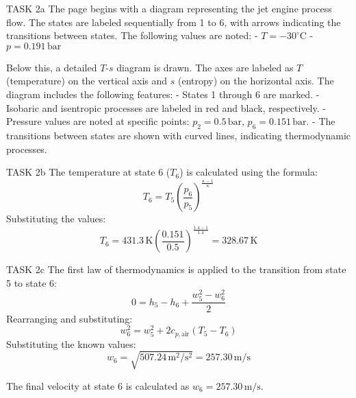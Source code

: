 TASK 2a  
The page begins with a diagram representing the jet engine process flow. The states are labeled sequentially from 1 to 6, with arrows indicating the transitions between states. The following values are noted:  
- \( T = -30^\circ\text{C} \)  
- \( p = 0.191 \, \text{bar} \)  

Below this, a detailed \( T \)-\( s \) diagram is drawn. The axes are labeled as \( T \) (temperature) on the vertical axis and \( s \) (entropy) on the horizontal axis. The diagram includes the following features:  
- States 1 through 6 are marked.  
- Isobaric and isentropic processes are labeled in red and black, respectively.  
- Pressure values are noted at specific points: \( p_2 = 0.5 \, \text{bar} \), \( p_6 = 0.151 \, \text{bar} \).  
- The transitions between states are shown with curved lines, indicating thermodynamic processes.  

TASK 2b  
The temperature at state 6 (\( T_6 \)) is calculated using the formula:  
\[
T_6 = T_5 \left( \frac{p_6}{p_5} \right)^{\frac{\kappa - 1}{\kappa}}
\]  
Substituting the values:  
\[
T_6 = 431.3 \, \text{K} \left( \frac{0.151}{0.5} \right)^{\frac{1.4 - 1}{1.4}} = 328.67 \, \text{K}
\]  

TASK 2c  
The first law of thermodynamics is applied to the transition from state 5 to state 6:  
\[
0 = h_5 - h_6 + \frac{w_5^2 - w_6^2}{2}
\]  
Rearranging and substituting:  
\[
w_6^2 = w_5^2 + 2 c_{p,\text{air}} (T_5 - T_6)
\]  
Substituting the known values:  
\[
w_6 = \sqrt{507.24 \, \text{m}^2/\text{s}^2} = 257.30 \, \text{m/s}
\]  

The final velocity at state 6 is calculated as \( w_6 = 257.30 \, \text{m/s} \).